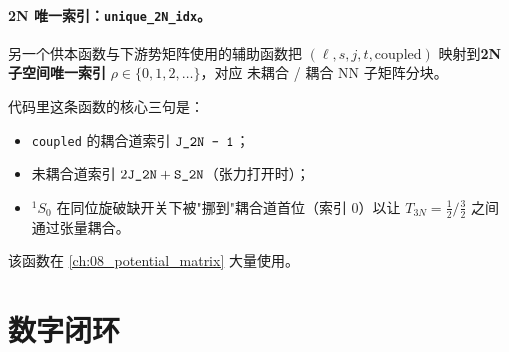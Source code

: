 \paragraph{2N 唯一索引：\texttt{unique\_2N\_idx}。}
另一个供本函数与下游势矩阵使用的辅助函数把 \((\ell, s, j, t, \text{coupled})\)
映射到\textbf{2N 子空间唯一索引} \(\rho \in \{0, 1, 2, \ldots\}\)，对应
未耦合 / 耦合 NN 子矩阵分块。


代码里这条函数的核心三句是：
\begin{itemize}
  \item \verb|coupled| 的耦合道索引 \(\verb|J_2N - 1|\)；
  \item 未耦合道索引 \(2 \verb|J_2N| + \verb|S_2N|\)（张力打开时）；
  \item \({}^1S_0\) 在同位旋破缺开关下被"挪到"耦合道首位（索引 0）以让
        \(T_{3N} = \tfrac{1}{2}/\tfrac{3}{2}\) 之间通过张量耦合。
\end{itemize}
该函数在 \cref{ch:08_potential_matrix} 大量使用。

\section{数字闭环}
\label{sec:ch03-numerics}


